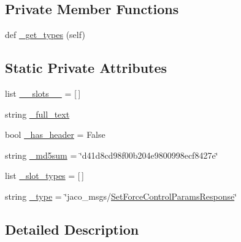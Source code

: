 \subsection*{Private Member Functions}
\begin{DoxyCompactItemize}
\item 
def \hyperlink{classjaco__msgs_1_1srv_1_1__SetForceControlParams_1_1SetForceControlParamsResponse_a1c0a8a8687a15d133cdd7f20cfbfd149}{\+\_\+get\+\_\+types} (self)
\end{DoxyCompactItemize}
\subsection*{Static Private Attributes}
\begin{DoxyCompactItemize}
\item 
list \hyperlink{classjaco__msgs_1_1srv_1_1__SetForceControlParams_1_1SetForceControlParamsResponse_a62123a9f643a91462046b7c8630778ca}{\+\_\+\+\_\+slots\+\_\+\+\_\+} = \mbox{[}$\,$\mbox{]}
\item 
string \hyperlink{classjaco__msgs_1_1srv_1_1__SetForceControlParams_1_1SetForceControlParamsResponse_a6c6e14a9ad6a0df0721433478d8785a2}{\+\_\+full\+\_\+text}
\item 
bool \hyperlink{classjaco__msgs_1_1srv_1_1__SetForceControlParams_1_1SetForceControlParamsResponse_af38b60f98b5f67921a5ce84acafc4ad1}{\+\_\+has\+\_\+header} = False
\item 
string \hyperlink{classjaco__msgs_1_1srv_1_1__SetForceControlParams_1_1SetForceControlParamsResponse_a864ff8cbee005abd45ed525bcb0fea55}{\+\_\+md5sum} = \char`\"{}d41d8cd98f00b204e9800998ecf8427e\char`\"{}
\item 
list \hyperlink{classjaco__msgs_1_1srv_1_1__SetForceControlParams_1_1SetForceControlParamsResponse_a44f86de8d1449c9a8cd61e71f9dbb262}{\+\_\+slot\+\_\+types} = \mbox{[}$\,$\mbox{]}
\item 
string \hyperlink{classjaco__msgs_1_1srv_1_1__SetForceControlParams_1_1SetForceControlParamsResponse_a2472e20c8a4d719aed1ca29213b233a1}{\+\_\+type} = \char`\"{}jaco\+\_\+msgs/\hyperlink{classjaco__msgs_1_1srv_1_1__SetForceControlParams_1_1SetForceControlParamsResponse}{Set\+Force\+Control\+Params\+Response}\char`\"{}
\end{DoxyCompactItemize}


\subsection{Detailed Description}


